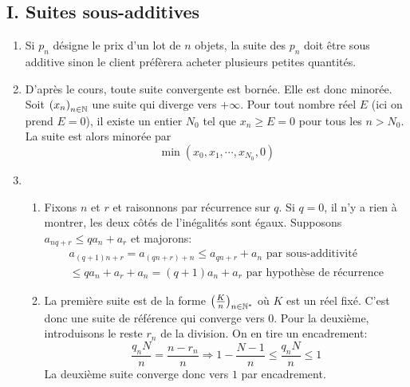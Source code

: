 \subsection*{I. Suites sous-additives}
\begin{enumerate}
 \item Si $p_n$ désigne le prix d'un lot de $n$ objets, la suite des $p_n$ doit être sous additive sinon le client préfèrera acheter plusieurs petites quantités.   
 \item D'après le cours, toute suite convergente est bornée. Elle est donc minorée.\newline
Soit $\left( x_n\right) _{n\in \mathbb{N}}$ une suite qui diverge vers $+\infty$. Pour tout nombre réel $E$ (ici on prend $E=0$), il existe un entier $N_0$ tel que $x_n\geq E=0$ pour tous les $n>N_0$. La suite est alors minorée par
\begin{displaymath}
 \min(x_0,x_1,\cdots,x_{N_0},0)
\end{displaymath}

 \item
\begin{enumerate}
 \item Fixons $n$ et $r$ et raisonnons par récurrence sur $q$. Si $q=0$, il n'y a rien à montrer, les deux côtés de l'inégalités sont égaux. Supposons $a_{nq+r}\leq qa_n+a_r$ et majorons:
\begin{multline*}
 a_{(q+1)n+r}=a_{(qn+r)+n}\leq a_{qn+r} + a_n\text{ par sous-additivité}\\
\leq qa_n + a_r + a_n = (q+1)a_n+a_r \text{ par hypothèse de récurrence}
\end{multline*}

 \item La première suite est de la forme $\left( \frac{K}{n}\right) _{n\in \mathbb{N}^*}$ où $K$ est un réel fixé. C'est donc une suite de référence qui converge vers $0$.\newline
 Pour la deuxième, introduisons le reste $r_n$ de la division. On en tire un encadrement:
\begin{displaymath}
  \frac{q_nN}{n} = \frac{n-r_n}{n} \Rightarrow 1-\frac{N-1}{n}\leq\frac{q_nN}{n}\leq 1
\end{displaymath}
La deuxième suite converge donc vers $1$ par encadrement.


\end{enumerate}
\end{enumerate}
